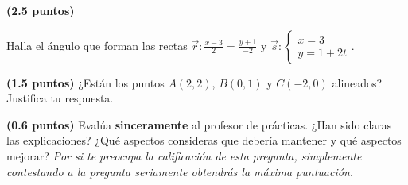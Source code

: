 \documentclass[palatino,noprobframes]{CuartillaSafa}
\renewcommand{\vec}[1]{\overrightarrow{#1}}
\begin{document}
\begin{problem}\textbf{(2.5 puntos)}

Halla el ángulo que forman las rectas $\displaystyle \vec{r}: \frac{x-3}{2} = \frac{y+1}{-2}$ y $\vec{s}: \left\{\begin{array}{c} x=3\\y=1+2t\end{array}\right.$. 

\end{problem}

\vspace{7cm}

\begin{problem}\textbf{(1.5 puntos)}
¿Están los puntos $A(2,2)$, $B(0,1)$ y $C(-2,0)$ alineados? Justifica tu respuesta.
\end{problem}

\vspace{8cm}

\begin{problem}\textbf{(0.6 puntos)}
Evalúa \textbf{sinceramente} al profesor de prácticas. ¿Han sido claras las explicaciones? ¿Qué aspectos consideras que debería mantener y qué aspectos mejorar? \textit{Por si te preocupa la calificación de esta pregunta, simplemente contestando a la pregunta seriamente obtendrás la máxima puntuación.}

\end{problem}

\end{document}
